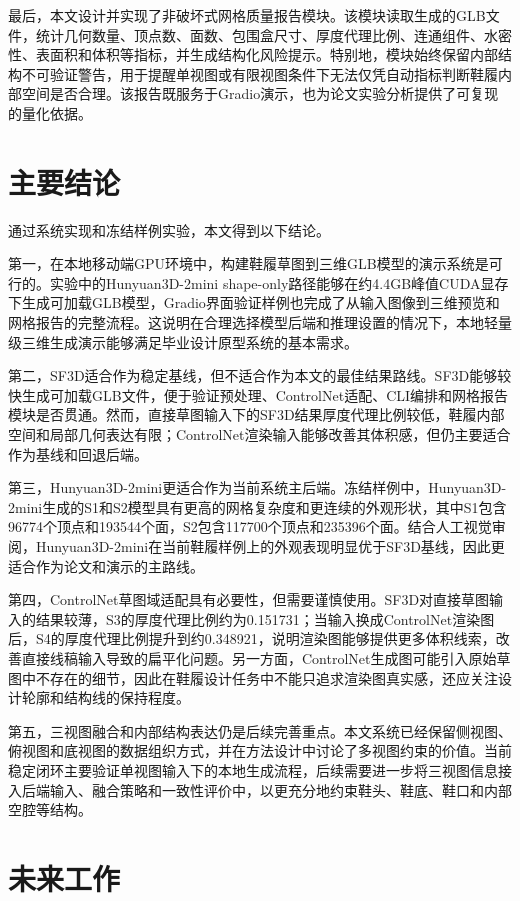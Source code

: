 最后，本文设计并实现了非破坏式网格质量报告模块。该模块读取生成的GLB文件，统计几何数量、顶点数、面数、包围盒尺寸、厚度代理比例、连通组件、水密性、表面积和体积等指标，并生成结构化风险提示。特别地，模块始终保留内部结构不可验证警告，用于提醒单视图或有限视图条件下无法仅凭自动指标判断鞋履内部空间是否合理。该报告既服务于Gradio演示，也为论文实验分析提供了可复现的量化依据。

\section{主要结论}

通过系统实现和冻结样例实验，本文得到以下结论。

第一，在本地移动端GPU环境中，构建鞋履草图到三维GLB模型的演示系统是可行的。实验中的Hunyuan3D-2mini shape-only路径能够在约4.4GB峰值CUDA显存下生成可加载GLB模型，Gradio界面验证样例也完成了从输入图像到三维预览和网格报告的完整流程。这说明在合理选择模型后端和推理设置的情况下，本地轻量级三维生成演示能够满足毕业设计原型系统的基本需求。

第二，SF3D适合作为稳定基线，但不适合作为本文的最佳结果路线。SF3D能够较快生成可加载GLB文件，便于验证预处理、ControlNet适配、CLI编排和网格报告模块是否贯通。然而，直接草图输入下的SF3D结果厚度代理比例较低，鞋履内部空间和局部几何表达有限；ControlNet渲染输入能够改善其体积感，但仍主要适合作为基线和回退后端。

第三，Hunyuan3D-2mini更适合作为当前系统主后端。冻结样例中，Hunyuan3D-2mini生成的S1和S2模型具有更高的网格复杂度和更连续的外观形状，其中S1包含96774个顶点和193544个面，S2包含117700个顶点和235396个面。结合人工视觉审阅，Hunyuan3D-2mini在当前鞋履样例上的外观表现明显优于SF3D基线，因此更适合作为论文和演示的主路线。

第四，ControlNet草图域适配具有必要性，但需要谨慎使用。SF3D对直接草图输入的结果较薄，S3的厚度代理比例约为0.151731；当输入换成ControlNet渲染图后，S4的厚度代理比例提升到约0.348921，说明渲染图能够提供更多体积线索，改善直接线稿输入导致的扁平化问题。另一方面，ControlNet生成图可能引入原始草图中不存在的细节，因此在鞋履设计任务中不能只追求渲染图真实感，还应关注设计轮廓和结构线的保持程度。

第五，三视图融合和内部结构表达仍是后续完善重点。本文系统已经保留侧视图、俯视图和底视图的数据组织方式，并在方法设计中讨论了多视图约束的价值。当前稳定闭环主要验证单视图输入下的本地生成流程，后续需要进一步将三视图信息接入后端输入、融合策略和一致性评价中，以更充分地约束鞋头、鞋底、鞋口和内部空腔等结构。

\section{未来工作}

